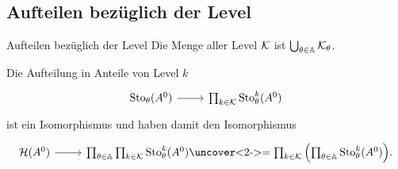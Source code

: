 \subsection{Aufteilen bezüglich der Level}
\begin{frame}[fragile]{Aufteilen bezüglich der Level}
  Die Menge aller Level $\mathcal{K}$ ist $\bigcup_{\theta\in\mathbb{A}}\mathcal{K}_\theta$.
  \begin{lem}
    Die Aufteilung in \openautoquote{}Anteile von Level $k$\closeautoquote{}
    \[\begin{tikzcd}[row sep=0cm]
        \Sto_\theta(A^0) \rar &
        \prod_{k\in\cK}\Sto_\theta^k(A^0)
    \end{tikzcd}\]
    ist ein Isomorphismus und haben damit den Isomorphismus
    \[\begin{tikzcd}
        \cH(A^0) \rar &
        \prod_{\theta\in\A}\prod_{k\in\cK}\Sto_\theta^k(A^0)
        \!\!
        \text{
          \uncover<2->{%
            $=\prod_{k\in\cK}\left(\prod_{\theta\in\A}\Sto_\theta^k(A^0)\right)$}.}
      \end{tikzcd}\]
  \end{lem}
\end{frame}

